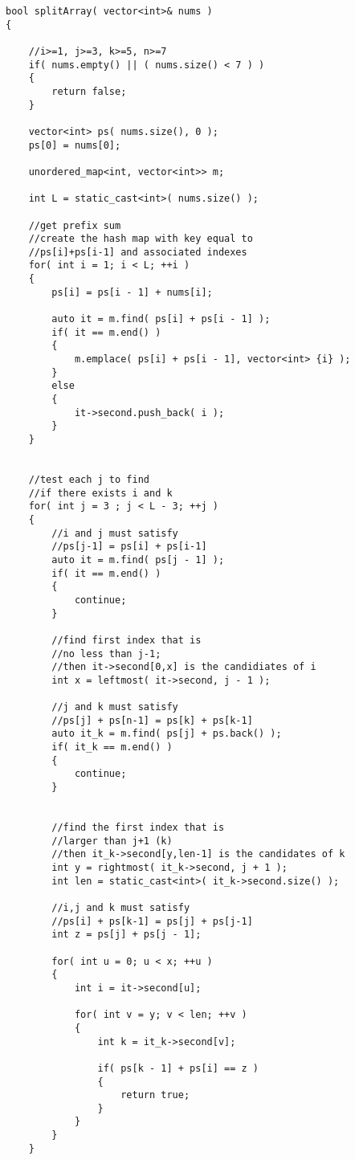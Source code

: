 \setcounter{lstlisting}{0}
\begin{lstlisting}[style=customc, caption={Hash Map}]
bool splitArray( vector<int>& nums )
{

    //i>=1, j>=3, k>=5, n>=7
    if( nums.empty() || ( nums.size() < 7 ) )
    {
        return false;
    }

    vector<int> ps( nums.size(), 0 );
    ps[0] = nums[0];

    unordered_map<int, vector<int>> m;

    int L = static_cast<int>( nums.size() );

    //get prefix sum
    //create the hash map with key equal to
    //ps[i]+ps[i-1] and associated indexes
    for( int i = 1; i < L; ++i )
    {
        ps[i] = ps[i - 1] + nums[i];

        auto it = m.find( ps[i] + ps[i - 1] );
        if( it == m.end() )
        {
            m.emplace( ps[i] + ps[i - 1], vector<int> {i} );
        }
        else
        {
            it->second.push_back( i );
        }
    }


    //test each j to find
    //if there exists i and k
    for( int j = 3 ; j < L - 3; ++j )
    {
        //i and j must satisfy
        //ps[j-1] = ps[i] + ps[i-1]
        auto it = m.find( ps[j - 1] );
        if( it == m.end() )
        {
            continue;
        }

        //find first index that is
        //no less than j-1;
        //then it->second[0,x] is the candidiates of i
        int x = leftmost( it->second, j - 1 );

        //j and k must satisfy
        //ps[j] + ps[n-1] = ps[k] + ps[k-1]
        auto it_k = m.find( ps[j] + ps.back() );
        if( it_k == m.end() )
        {
            continue;
        }


        //find the first index that is
        //larger than j+1 (k)
        //then it_k->second[y,len-1] is the candidates of k
        int y = rightmost( it_k->second, j + 1 );
        int len = static_cast<int>( it_k->second.size() );

        //i,j and k must satisfy
        //ps[i] + ps[k-1] = ps[j] + ps[j-1]
        int z = ps[j] + ps[j - 1];

        for( int u = 0; u < x; ++u )
        {
            int i = it->second[u];

            for( int v = y; v < len; ++v )
            {
                int k = it_k->second[v];

                if( ps[k - 1] + ps[i] == z )
                {
                    return true;
                }
            }
        }
    }


\end{lstlisting}
